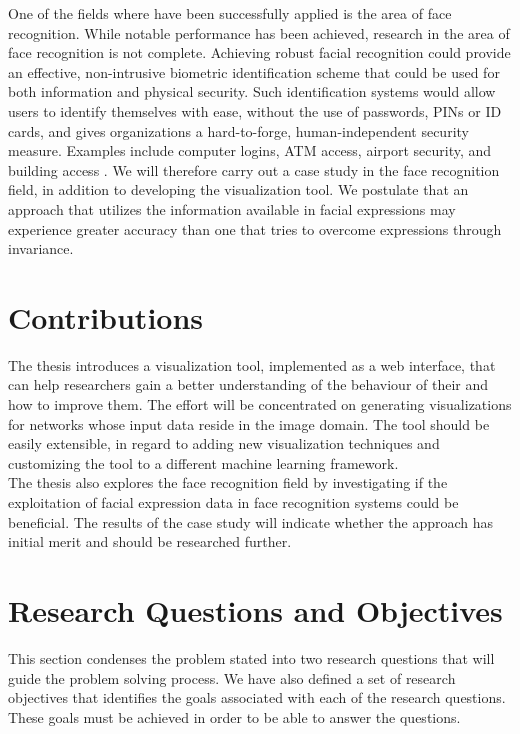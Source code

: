 \noindent One of the fields where  have been successfully applied is the area of face recognition. While notable performance has been achieved, research in the area of face recognition is not complete. Achieving robust facial recognition could provide an effective, non-intrusive biometric identification scheme that could be used for both information and physical security. Such identification systems would allow users to identify themselves with ease, without the use of passwords, PINs or ID cards, and gives organizations a hard-to-forge, human-independent security measure. Examples include computer logins, ATM access, airport security, and building access \cite{application-1, application-2, application-3}. We will therefore carry out a case study in the face recognition field, in addition to developing the visualization tool. We postulate that an approach that utilizes the information available in facial expressions may experience greater accuracy than one that tries to overcome expressions through invariance. \\


\section{Contributions}

The thesis introduces a visualization tool, implemented as a web interface, that can help researchers gain a better understanding of the behaviour of their  and how to improve them. The effort will be concentrated on generating visualizations for networks whose input data reside in the image domain. The tool should be easily extensible, in regard to adding new visualization techniques and customizing the tool to a different machine learning framework. \\

\noindent The thesis also explores the face recognition field by investigating if the exploitation of facial expression data in face recognition systems could be beneficial. The results of the case study will indicate whether the approach has initial merit and should be researched further.

\section{Research Questions and Objectives} \label{sec:research-questions}

This section condenses the problem stated into two research questions that will guide the problem solving process. We have also defined a set of research objectives that identifies the goals associated with each of the research questions. These goals must be achieved in order to be able to answer the questions.

